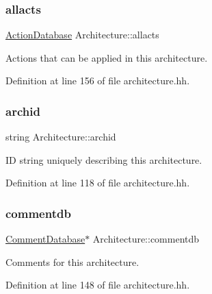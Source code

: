 \mbox{\label{class_architecture_a4cbe1c5d170cb2a4d359765b97fef26f}} 
\subsubsection{\texorpdfstring{allacts}{allacts}}
{\footnotesize\ttfamily \mbox{\hyperlink{class_action_database}{Action\+Database}} Architecture\+::allacts}



Actions that can be applied in this architecture. 



Definition at line 156 of file architecture.\+hh.

\mbox{\label{class_architecture_a78260a0e141deda850d56d17e6e728cf}} 
\subsubsection{\texorpdfstring{archid}{archid}}
{\footnotesize\ttfamily string Architecture\+::archid}



ID string uniquely describing this architecture. 



Definition at line 118 of file architecture.\+hh.

\mbox{\label{class_architecture_a5425576df9b7ce15b6ddddbf17b03df6}} 
\subsubsection{\texorpdfstring{commentdb}{commentdb}}
{\footnotesize\ttfamily \mbox{\hyperlink{class_comment_database}{Comment\+Database}}$\ast$ Architecture\+::commentdb}



Comments for this architecture. 



Definition at line 148 of file architecture.\+hh.

\mbox{\label{class_architecture_abbbd3d4cf806f7ca3a2a2943aab28165}} 

